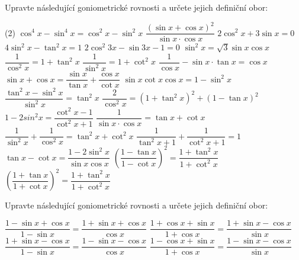 \documentclass[12pt,a4paper]{article}
\begin{document}
\begin{exercise}[Upravte II.]
    Upravte následující goniometrické rovnosti a určete jejich definiční obor:
    \begin{tasks}(2)
        \task $\cos^4 x - \sin^4 x = \cos^2 x - \sin^2 x$
        \task $\dfrac{\left(\sin x + \cos x\right)^2}{\sin x \cdot \cos x}$
        \task $2 \cos^2 x + 3 \sin x = 0$
        \task $4 \sin^2 x - \tan^2 x = 1$
        \task $2 \cos^2 3x - \sin 3x - 1 = 0$
        \task $\sin^2 x = \sqrt{3} \sin x \cos x$
        \task $\dfrac{1}{\cos^2 x} = 1 + \tan^2 x$
        \task $\dfrac{1}{\sin^2 x} = 1 + \cot^2 x$
        \task $\dfrac{1}{\cos x} - \sin x \cdot \tan x = \cos x$
        \task $\sin x + \cos x = \dfrac{\sin x}{\tan x} + \dfrac{\cos x}{\cot x}$
        \task $\sin x \cot x \cos x = 1 - \sin^2 x$
        \task $\dfrac{\tan^2 x - \sin^2 x}{\sin^2 x} = \tan^2 x$
        \task $\dfrac{2}{\cos^2 x} = \left(1 + \tan^2 x\right)^2 + \left(1 - \tan x\right)^2$
        \task $1 - 2sin^2 x = \dfrac{\cot^2 x - 1}{\cot^2 x + 1}$
        \task $\dfrac{1}{\sin x \cdot \cos x} = \tan x + \cot x$
        \task $\dfrac{1}{\sin^2 x} + \dfrac{1}{\cos^2 x} = \tan^2 x + \cot^2 x$
        \task $\dfrac{1}{\tan^2 x + 1} + \dfrac{1}{\cot^2 x + 1} = 1$
        \task $\tan x - \cot x = \dfrac{1 - 2 \sin^2 x}{\sin x \cos x}$
        \task $\left(\dfrac{1 - \tan x}{1 - \cot x}\right)^2 = \dfrac{1 + \tan^2 x}{1 + \cot^2 x}$
        \task $\left(\dfrac{1 + \tan x}{1 + \cot x}\right)^2 = \dfrac{1 + \tan^2 x}{1 + \cot^2 x}$
        \task {}
    \end{tasks}
\end{exercise}


\begin{exercise}
    Upravte následující goniometrické rovnosti a určete jejich definiční obor:
    \begin{tasks}
        \task $\dfrac{1 - \sin x + \cos x}{1 - \sin x} = \dfrac{1 + \sin x + \cos x}{\cos x}$
        \task $\dfrac{1 + \cos x + \sin x}{1 + \cos x} = \dfrac{ 1 + \sin x - \cos x}{\sin x}$
        \task $\dfrac{1 + \sin x - \cos x}{1 - \sin x} = \dfrac{1 - \sin x - \cos x}{\cos x}$
        \task $\dfrac{1 - \cos x + \sin x}{1 + \cos x} = \dfrac{1 - \sin x - \cos x}{\sin x}$
    \end{tasks}
\end{exercise}
\end{document}
